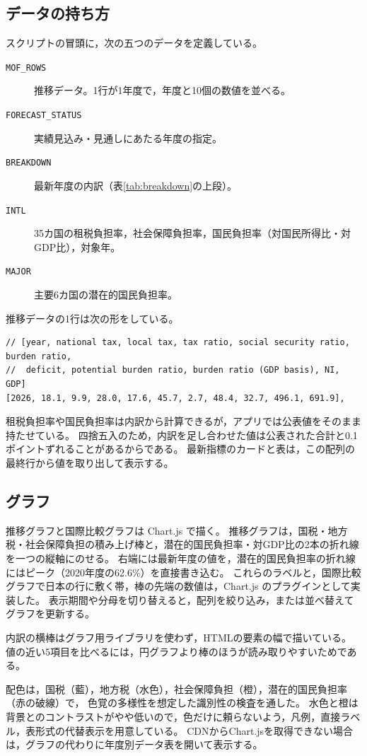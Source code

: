 \documentclass[paper=a4,fontsize=10pt]{jlreq}
\newcommand{\code}[1]{\texttt{#1}}
\begin{document}
\subsection{データの持ち方}

スクリプトの冒頭に，次の五つのデータを定義している。
\begin{description}
  \item[\code{MOF\_ROWS}] 推移データ。1行が1年度で，年度と10個の数値を並べる。
  \item[\code{FORECAST\_STATUS}] 実績見込み・見通しにあたる年度の指定。
  \item[\code{BREAKDOWN}] 最新年度の内訳（表\ref{tab:breakdown}の上段）。
  \item[\code{INTL}] 35カ国の租税負担率，社会保障負担率，国民負担率（対国民所得比・対GDP比），対象年。
  \item[\code{MAJOR}] 主要6カ国の潜在的国民負担率。
\end{description}
推移データの1行は次の形をしている。
\begin{lstlisting}
// [year, national tax, local tax, tax ratio, social security ratio, burden ratio,
//  deficit, potential burden ratio, burden ratio (GDP basis), NI, GDP]
[2026, 18.1, 9.9, 28.0, 17.6, 45.7, 2.7, 48.4, 32.7, 496.1, 691.9],
\end{lstlisting}
租税負担率や国民負担率は内訳から計算できるが，アプリでは公表値をそのまま持たせている。
四捨五入のため，内訳を足し合わせた値は公表された合計と0.1ポイントずれることがあるからである。
最新指標のカードと表は，この配列の最終行から値を取り出して表示する。

\subsection{グラフ}

推移グラフと国際比較グラフは Chart.js で描く。
推移グラフは，国税・地方税・社会保障負担の積み上げ棒と，潜在的国民負担率・対GDP比の2本の折れ線を一つの縦軸にのせる。
右端には最新年度の値を，潜在的国民負担率の折れ線にはピーク（2020年度の62.6\%）を直接書き込む。
これらのラベルと，国際比較グラフで日本の行に敷く帯，棒の先端の数値は，Chart.js のプラグインとして実装した。
表示期間や分母を切り替えると，配列を絞り込み，または並べ替えてグラフを更新する。

内訳の横棒はグラフ用ライブラリを使わず，HTMLの要素の幅で描いている。
値の近い5項目を比べるには，円グラフより棒のほうが読み取りやすいためである。

配色は，国税（藍），地方税（水色），社会保障負担（橙），潜在的国民負担率（赤の破線）で，
色覚の多様性を想定した識別性の検査を通した。
水色と橙は背景とのコントラストがやや低いので，色だけに頼らないよう，凡例，直接ラベル，表形式の代替表示を用意している。
CDNからChart.jsを取得できない場合は，グラフの代わりに年度別データ表を開いて表示する。
\end{document}
